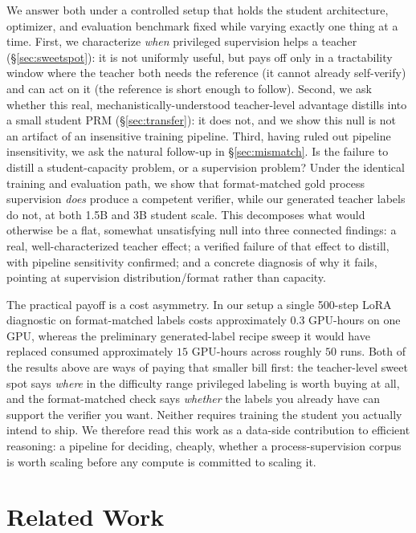 \documentclass{article}
\begin{document}
We answer both under a controlled setup that holds the student architecture,
optimizer, and evaluation benchmark fixed while varying exactly one thing at
a time. First, we characterize \emph{when} privileged supervision helps a
teacher (\S\ref{sec:sweetspot}): it is not uniformly useful, but pays off
only in a tractability window where the teacher both needs the reference (it
cannot already self-verify) and can act on it (the reference is short enough
to follow). Second, we ask whether this real, mechanistically-understood
teacher-level advantage distills into a small student PRM
(\S\ref{sec:transfer}): it does not, and we show this null is not an
artifact of an insensitive training pipeline. Third, having ruled out
pipeline insensitivity, we ask the natural follow-up in
\S\ref{sec:mismatch}. Is the failure to distill a student-capacity problem,
or a supervision problem? Under the identical training and evaluation path, we
show that format-matched gold process supervision \emph{does} produce a
competent verifier, while our generated teacher labels do not, at both 1.5B
and 3B student scale. This decomposes what would otherwise be a flat,
somewhat unsatisfying null into three connected findings: a real,
well-characterized teacher effect; a verified failure of that effect to
distill, with pipeline sensitivity confirmed; and a concrete diagnosis of
why it fails, pointing at supervision distribution/format rather than
capacity.

The practical payoff is a cost asymmetry. In our setup a single 500-step LoRA
diagnostic on format-matched labels costs approximately $0.3$ GPU-hours on one
GPU, whereas the preliminary generated-label recipe sweep it would have
replaced consumed approximately $15$ GPU-hours across roughly $50$ runs. Both
of the results above are ways of paying that smaller bill first: the
teacher-level sweet spot says \emph{where} in the difficulty range privileged
labeling is worth buying at all, and the format-matched check says
\emph{whether} the labels you already have can support the verifier you want.
Neither requires training the student you actually intend to ship. We
therefore read this work as a data-side contribution to efficient reasoning:
a pipeline for deciding, cheaply, whether a process-supervision corpus is
worth scaling before any compute is committed to scaling it.

\section{Related Work}
\label{sec:related}
\end{document}
